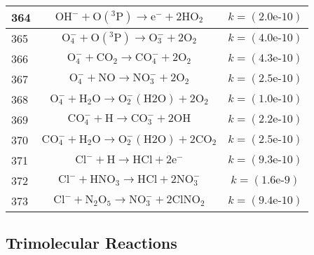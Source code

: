 \begin{longtable}{| m{} | m{}| m{} |}
\hline
 364 & $$ \mathrm{OH^-} + \mathrm{O(^3P)}\longrightarrow \mathrm{e^-} + 2\mathrm{HO_2} $$ & $$k = (\textrm{2.0e-10}) $$ \\
\hline
 365 & $$ \mathrm{O_4^-} + \mathrm{O(^3P)}\longrightarrow \mathrm{O_3^-} + 2\mathrm{O_2} $$ & $$k = (\textrm{4.0e-10}) $$ \\
\hline
 366 & $$ \mathrm{O_4^-} + \mathrm{CO_2}\longrightarrow \mathrm{CO_4^-} + 2\mathrm{O_2} $$ & $$k = (\textrm{4.3e-10}) $$ \\
\hline
 367 & $$ \mathrm{O_4^-} + \mathrm{NO}\longrightarrow \mathrm{NO_3^-} + 2\mathrm{O_2} $$ & $$k = (\textrm{2.5e-10}) $$ \\
\hline
 368 & $$ \mathrm{O_4^-} + \mathrm{H_2O}\longrightarrow \mathrm{O_2^-(H2O)} + 2\mathrm{O_2} $$ & $$k = (\textrm{1.0e-10}) $$ \\
\hline
 369 & $$ \mathrm{CO_4^-} + \mathrm{H}\longrightarrow \mathrm{CO_3^-} + 2\mathrm{OH} $$ & $$k = (\textrm{2.2e-10}) $$ \\
\hline
 370 & $$ \mathrm{CO_4^-} + \mathrm{H_2O}\longrightarrow \mathrm{O_2^-(H2O)} + 2\mathrm{CO_2} $$ & $$k = (\textrm{2.5e-10}) $$ \\
\hline
 371 & $$ \mathrm{Cl^-} + \mathrm{H}\longrightarrow \mathrm{HCl} + 2\mathrm{e^-} $$ & $$k = (\textrm{9.3e-10}) $$ \\
\hline
 372 & $$ \mathrm{Cl^-} + \mathrm{HNO_3}\longrightarrow \mathrm{HCl} + 2\mathrm{NO_3^-} $$ & $$k = (\textrm{1.6e-9}) $$ \\
\hline
 373 & $$ \mathrm{Cl^-} + \mathrm{N_2O_5}\longrightarrow \mathrm{NO_3^-} + 2\mathrm{ClNO_2} $$ & $$k = (\textrm{9.4e-10}) $$ \\
\hline
\end{longtable}




\subsection{Trimolecular Reactions}

